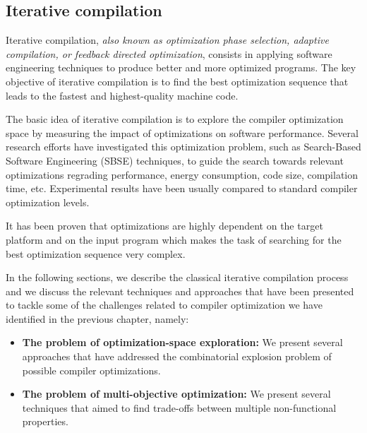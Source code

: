 \subsection{Iterative compilation}
Iterative compilation, \textit{also known as optimization phase selection, adaptive compilation, or feedback directed optimization}\cite{triantafyllis2003compiler}, consists in applying software engineering techniques to produce better and more optimized programs. The key objective of iterative compilation is to find the best optimization sequence that leads to the fastest and highest-quality machine code. 

The basic idea of iterative compilation is to explore the compiler optimization space by measuring the impact of optimizations on software performance.
Several research efforts have investigated this optimization problem, such as Search-Based Software Engineering (SBSE) techniques, to guide the search towards relevant optimizations regrading performance, energy consumption, code size, compilation time, etc. Experimental results have been usually compared to standard compiler optimization levels.  

It has been proven that optimizations are highly dependent on the target platform and on the input program which makes the task of searching for the best optimization sequence very complex\cite{triantafyllis2003compiler}.

In the following sections, we describe the classical iterative compilation process and we discuss the relevant techniques and approaches that have been presented to tackle some of the challenges related to compiler optimization we have identified in the previous chapter, namely:
\begin{itemize}
	\item \textbf{The problem of optimization-space exploration:} We present several approaches that have addressed the combinatorial explosion problem of possible compiler optimizations.
	
	\item \textbf{The problem of multi-objective optimization:} We present several techniques that aimed to find trade-offs between multiple non-functional properties.
		
\end{itemize}

